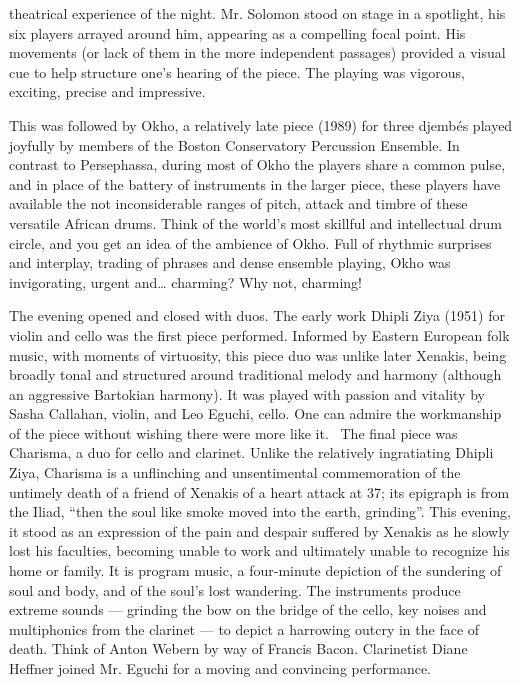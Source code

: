 theatrical experience of the night. Mr. Solomon stood on stage in a spotlight, his six players arrayed around him, appearing as a compelling focal point. His movements (or lack of them in the more independent passages) provided a visual cue to help structure one’s hearing of the piece. The playing was vigorous, exciting, precise and impressive.

This was followed by Okho, a relatively late piece (1989) for three djembés played joyfully by members of the Boston Conservatory Percussion Ensemble. In contrast to Persephassa, during most of Okho the players share a common pulse, and in place of the battery of instruments in the larger piece, these players have available the not inconsiderable ranges of pitch, attack and timbre of these versatile African drums. Think of the world’s most skillful and intellectual drum circle, and you get an idea of the ambience of Okho. Full of rhythmic surprises and interplay, trading of phrases and dense ensemble playing, Okho was invigorating, urgent and… charming? Why not, charming!

The evening opened and closed with duos. The early work Dhipli Ziya (1951) for violin and cello was the first piece performed. Informed by Eastern European folk music, with moments of virtuosity, this piece duo was unlike later Xenakis, being broadly tonal and structured around traditional melody and harmony (although an aggressive Bartokian harmony). It was played with passion and vitality by Sasha Callahan, violin, and Leo Eguchi, cello. One can admire the workmanship of the piece without wishing there were more like it.  The final piece was Charisma, a duo for cello and clarinet. Unlike the relatively ingratiating Dhipli Ziya, Charisma is a unflinching and unsentimental commemoration of the untimely death of a friend of Xenakis of a heart attack at 37; its epigraph is from the Iliad, “then the soul like smoke moved into the earth, grinding”. This evening, it stood as an expression of the pain and despair suffered by Xenakis as he slowly lost his faculties, becoming unable to work and ultimately unable to recognize his home or family. It is program music, a four-minute depiction of the sundering of soul and body, and of the soul’s lost wandering. The instruments produce extreme sounds — grinding the bow on the bridge of the cello, key noises and multiphonics from the clarinet — to depict a harrowing outcry in the face of death. Think of Anton Webern by way of Francis Bacon. Clarinetist Diane Heffner joined Mr. Eguchi for a moving and convincing performance.

